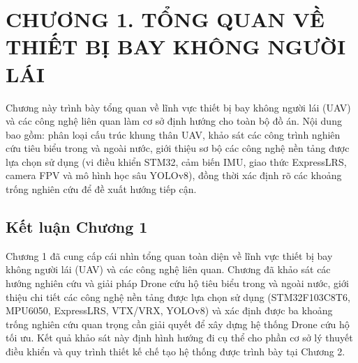 \section*{CHƯƠNG 1. TỔNG QUAN VỀ THIẾT BỊ BAY KHÔNG NGƯỜI LÁI}
\setcounter{section}{1}
\setcounter{subsection}{0}
\setcounter{figure}{0}
\setcounter{table}{0}

Chương này trình bày tổng quan về lĩnh vực thiết bị bay không người lái (UAV) và các công nghệ liên quan làm cơ sở định hướng cho toàn bộ đồ án. Nội dung bao gồm: phân loại cấu trúc khung thân UAV, khảo sát các công trình nghiên cứu tiêu biểu trong và ngoài nước, giới thiệu sơ bộ các công nghệ nền tảng được lựa chọn sử dụng (vi điều khiển STM32, cảm biến IMU, giao thức ExpressLRS, camera FPV và mô hình học sâu YOLOv8), đồng thời xác định rõ các khoảng trống nghiên cứu để đề xuất hướng tiếp cận.



\subsection*{Kết luận Chương 1}

Chương 1 đã cung cấp cái nhìn tổng quan toàn diện về lĩnh vực thiết bị bay không người lái (UAV) và các công nghệ liên quan. Chương đã khảo sát các hướng nghiên cứu và giải pháp Drone cứu hộ tiêu biểu trong và ngoài nước, giới thiệu chi tiết các công nghệ nền tảng được lựa chọn sử dụng (STM32F103C8T6, MPU6050, ExpressLRS, VTX/VRX, YOLOv8) và xác định được ba khoảng trống nghiên cứu quan trọng cần giải quyết để xây dựng hệ thống Drone cứu hộ tối ưu. Kết quả khảo sát này định hình hướng đi cụ thể cho phần cơ sở lý thuyết điều khiển và quy trình thiết kế chế tạo hệ thống được trình bày tại Chương 2.
